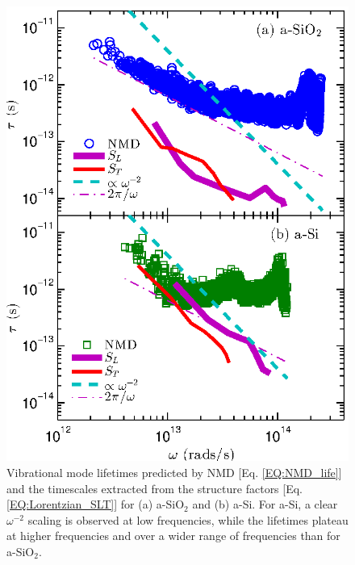 \documentclass[aps,prb,twocolumn,superscriptaddress,footinbib,amsmath,amssymb,floatfix]{revtex4}
\begin{document}
\begin{figure}
\begin{center}
\includegraphics[scale=1.0]
{fig4.eps}
\vspace*{-5mm}
\end{center}
\caption{\label{FIG:Lifetimes} Vibrational mode lifetimes predicted by 
NMD [Eq. \eqref{EQ:NMD_life}] and the timescales extracted from the 
structure factors 
[Eq. \eqref{EQ:Lorentzian_SLT}] for (a) a-SiO$_2$ and (b) a-Si. 
For a-Si, a clear $\omega^{-2}$ scaling is observed at low frequencies, 
while the lifetimes plateau at higher frequencies and 
over a wider range of frequencies than for a-SiO$_2$.}
\end{figure}
\end{document}
